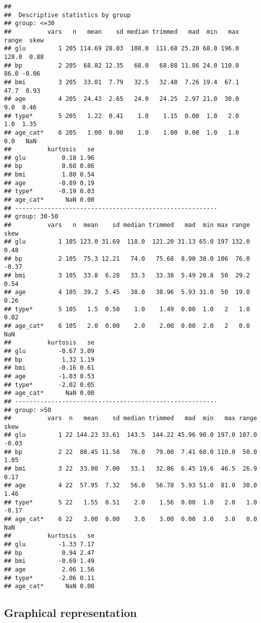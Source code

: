 \documentclass[]{book}
\theoremstyle{definition}
\theoremstyle{definition}
\theoremstyle{definition}
\theoremstyle{remark}
\begin{document}
\begin{verbatim}
## 
##  Descriptive statistics by group 
## group: <=30
##          vars   n   mean    sd median trimmed   mad  min   max range  skew
## glu         1 205 114.69 28.03  108.0  111.68 25.20 68.0 196.0 128.0  0.88
## bp          2 205  68.82 12.35   68.0   68.88 11.86 24.0 110.0  86.0 -0.06
## bmi         3 205  33.01  7.79   32.5   32.48  7.26 19.4  67.1  47.7  0.93
## age         4 205  24.43  2.65   24.0   24.25  2.97 21.0  30.0   9.0  0.46
## type*       5 205   1.22  0.41    1.0    1.15  0.00  1.0   2.0   1.0  1.35
## age_cat*    6 205   1.00  0.00    1.0    1.00  0.00  1.0   1.0   0.0   NaN
##          kurtosis   se
## glu          0.18 1.96
## bp           0.68 0.86
## bmi          1.80 0.54
## age         -0.89 0.19
## type*       -0.19 0.03
## age_cat*      NaN 0.00
## -------------------------------------------------------- 
## group: 30-50
##          vars   n  mean    sd median trimmed   mad  min max range  skew
## glu         1 105 123.0 31.69  118.0  121.20 31.13 65.0 197 132.0  0.48
## bp          2 105  75.3 12.21   74.0   75.68  8.90 30.0 106  76.0 -0.37
## bmi         3 105  33.8  6.28   33.3   33.38  5.49 20.8  50  29.2  0.54
## age         4 105  39.2  5.45   38.0   38.96  5.93 31.0  50  19.0  0.26
## type*       5 105   1.5  0.50    1.0    1.49  0.00  1.0   2   1.0  0.02
## age_cat*    6 105   2.0  0.00    2.0    2.00  0.00  2.0   2   0.0   NaN
##          kurtosis   se
## glu         -0.67 3.09
## bp           1.32 1.19
## bmi         -0.16 0.61
## age         -1.03 0.53
## type*       -2.02 0.05
## age_cat*      NaN 0.00
## -------------------------------------------------------- 
## group: >50
##          vars  n   mean    sd median trimmed   mad  min   max range  skew
## glu         1 22 144.23 33.61  143.5  144.22 45.96 90.0 197.0 107.0 -0.03
## bp          2 22  80.45 11.58   76.0   79.00  7.41 60.0 110.0  50.0  1.05
## bmi         3 22  33.00  7.00   33.1   32.86  6.45 19.6  46.5  26.9  0.17
## age         4 22  57.95  7.32   56.0   56.78  5.93 51.0  81.0  30.0  1.46
## type*       5 22   1.55  0.51    2.0    1.56  0.00  1.0   2.0   1.0 -0.17
## age_cat*    6 22   3.00  0.00    3.0    3.00  0.00  3.0   3.0   0.0   NaN
##          kurtosis   se
## glu         -1.33 7.17
## bp           0.94 2.47
## bmi         -0.69 1.49
## age          2.06 1.56
## type*       -2.06 0.11
## age_cat*      NaN 0.00
\end{verbatim}

\subsection{Graphical representation}\label{graphical-representation-1}
\end{document}
